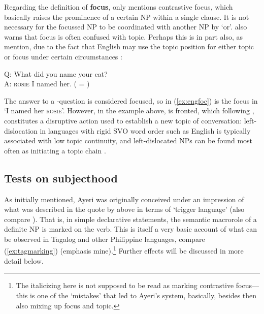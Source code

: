 Regarding the definition of \textbf{focus}, \citet[174]{dixon2010a} only
mentions contrastive focus, which basically raises the prominence of a certain
NP within a single clause. It is not necessary for the focussed NP to be
coordinated with another NP by `or'. \citet{dixon2010a} also warns that focus
is often confused with topic. Perhaps this is in part also, as
\citet{bresnan2016} mention, due to the fact that English may use the topic
position for either topic or focus under certain circumstances 
\parencite[98]{bresnan2016}:

\ex\label{ex:engfoc}%
Q: What did you name your cat?\\
A: \textsc{rosie} I named her. ( = \Foc{})
\xe

The answer to a -question is considered focused, so  in
(\ref{ex:engfoc}) is the focus in `I named her \textsc{rosie}'. However, in the
example above,  is fronted, which following \citet{givon1983},
constitutes a disruptive action used to establish a new topic of conversation:
left-dislocation in languages with rigid SVO word order such as English is
typically associated with low topic continuity, and left-dislocated NPs can be
found most often as initiating a topic chain \citep[32]{givon1983}.

\subsection{Tests on subjecthood}
\label{subsec:subjecthood}

As initially mentioned, Ayeri was originally conceived under an impression of
what was described in the quote by \citet{cowan1995} above in terms of `trigger
language' (also compare \cite{schachter2015}). That is, in simple declarative
statements, the semantic macrorole of a definite NP is marked on the verb. This
is itself a very basic account of what can be observed in Tagalog and other
Philippine languages, compare (\ref{ex:tagmarking}) (emphasis
mine).\footnote{The italicizing here is not supposed to be read as marking
contrastive focus---this is one of the `mistakes' that led to Ayeri's system,
basically, besides then also mixing up focus and topic.} Further
effects will be discussed in more detail below.

